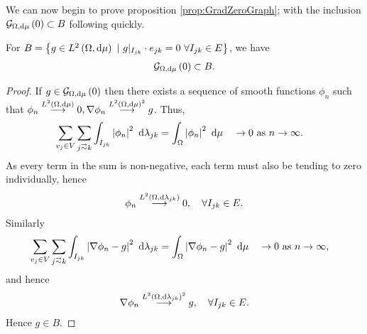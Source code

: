We can now begin to prove proposition \ref{prop:GradZeroGraph}; with the inclusion $\mathcal{G}_{ \Omega, \mathrm{d}\mu}\left( 0 \right) \subset B$ following quickly.
\begin{prop} \label{prop:Grad0IncB}
	For $B = \clbracs{g\in\ltwo{\ddom}{\ddmes} \ \vert \ g\vert_{I_{jk}}\cdot e_{jk}=0 \ \forall I_{jk}\in E}$, we have
	\begin{align*}
		\mathcal{G}_{ \Omega, \mathrm{d}\mu}\left( 0 \right) \subset B.
	\end{align*}
\end{prop}
\begin{proof}
	If $g\in\mathcal{G}_{ \Omega, \mathrm{d}\mu}\left( 0 \right)$ then there exists a sequence of smooth functions $\phi_n$ such that $\phi_n\overset{L^{2}\left( \Omega,\mathrm{d}\mu \right)}{\longrightarrow}0, \nabla\phi_n\overset{L^{2}\left( \Omega,\mathrm{d}\mu \right)^2}{\longrightarrow}g$.
	Thus,
	\begin{align*}
		\sum_{v_j\in V}\sum_{j\conLeft k}\integral{I_{jk}}{\abs{\phi_n}^2}{\lambda_{jk}} &= \integral{\ddom}{\abs{\phi_n}^2}{\ddmes} \quad \rightarrow 0 \toInfty{n}.
	\end{align*}
	As every term in the sum is non-negative, each term must also be tending to zero individually, hence
	\begin{align*}
		\phi_n\overset{L^{2}\left( \Omega,\mathrm{d}\lambda_{jk} \right)}{\longrightarrow}0, \quad \forall I_{jk}\in E.
	\end{align*}
	Similarly
	\begin{align*}
		\sum_{v_j\in V}\sum_{j\conLeft k}\integral{I_{jk}}{\abs{\grad\phi_n - g}^2}{\lambda_{jk}} &= \integral{\ddom}{\abs{\grad\phi_n - g}^2}{\ddmes} \quad
		\rightarrow 0 \toInfty{n},
	\end{align*}	
	and hence 
	\begin{align*}
		\nabla\phi_n\overset{L^{2}\left( \Omega,\mathrm{d}\lambda_{jk} \right)^2}{\longrightarrow} g, \quad \forall I_{jk}\in E.
	\end{align*}
	Hence $g\in B$.
\end{proof}

